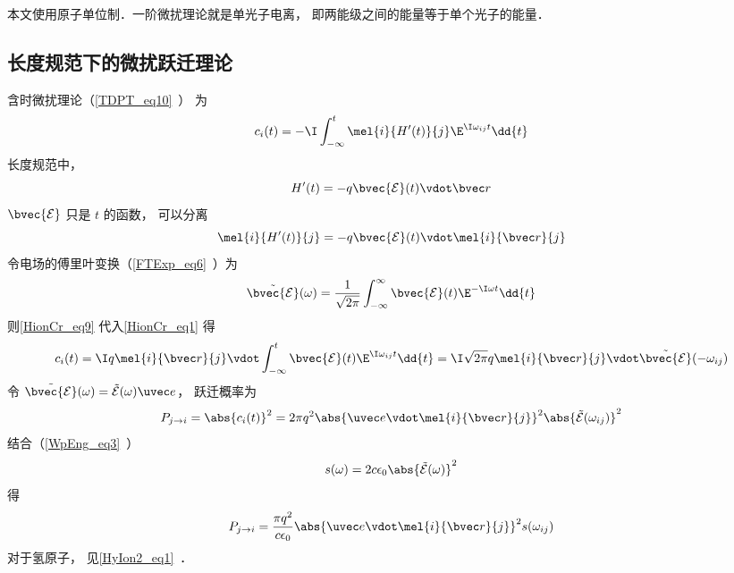 
\begin{issues}
\issueDraft
\end{issues}


本文使用原子单位制．一阶微扰理论就是单光子电离， 即两能级之间的能量等于单个光子的能量．

\subsection{长度规范下的微扰跃迁理论}
含时微扰理论（\autoref{TDPT_eq10}~） 为
\begin{equation}\label{HionCr_eq1}
c_i(t) = -\I \int_{-\infty}^t \mel{i}{H'(t)}{j} \E^{\I\omega_{ij} t} \dd{t}
\end{equation}
长度规范中，
\begin{equation}
H'(t) = -q\bvec {\mathcal E}(t) \vdot \bvec r
\end{equation}
$\bvec {\mathcal E}$ 只是 $t$ 的函数， 可以分离
\begin{equation}\label{HionCr_eq9}
\mel{i}{H'(t)}{j} = -q\bvec {\mathcal E}(t) \vdot \mel{i}{\bvec r}{j}
\end{equation}
令电场的傅里叶变换（\autoref{FTExp_eq6}~）为
\begin{equation}
\tilde {\bvec {\mathcal E}}(\omega) = \frac{1}{\sqrt{2\pi}} \int_{-\infty}^{\infty} \bvec {\mathcal E}(t) \E^{-\I\omega t} \dd{t}
\end{equation}
则\autoref{HionCr_eq9} 代入\autoref{HionCr_eq1} 得
\begin{equation}\label{HionCr_eq7}
c_i(t) = \I q \mel{i}{\bvec r}{j} \vdot \int_{-\infty}^t \bvec {\mathcal E}(t) \E^{\I\omega_{ij} t} \dd{t} = \I \sqrt{2\pi} q \mel{i}{\bvec r}{j} \vdot \tilde {\bvec {\mathcal E}}(-\omega_{ij})
\end{equation}
令 $\tilde {\bvec {\mathcal E}}(\omega) = \tilde {{\mathcal E}}(\omega)\uvec e$， 跃迁概率为
\begin{equation}\label{HionCr_eq2}
P_{j\to i} = \abs{c_i(t)}^2 = 2\pi q^2 \abs{\uvec e \vdot \mel{i}{\bvec r}{j}}^2 \abs{\tilde {{\mathcal E}}(\omega_{ij})}^2
\end{equation}
结合（\autoref{WpEng_eq3}~）
\begin{equation}
s(\omega) = 2c\epsilon_0 \abs{\tilde {{\mathcal E}}(\omega)}^2
\end{equation}
得
\begin{equation}\label{HionCr_eq6}
P_{j\to i} = \frac{\pi q^2}{c\epsilon_0} \abs{\uvec e \vdot\mel{i}{\bvec r}{j}}^2 s(\omega_{ij})
\end{equation}
对于氢原子， 见\autoref{HyIon2_eq1}~．

